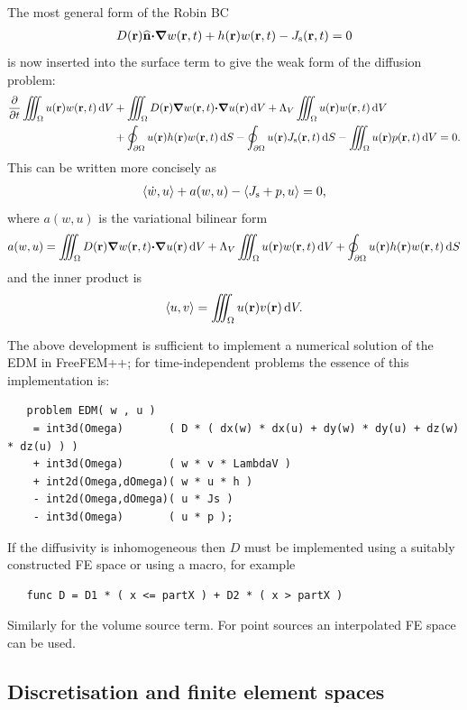\documentclass[a4paper]{article}
\numberwithin{equation}{section}
\providecommand\oiint{\oint}
\begin{document}
The most general form of the Robin BC
\begin{align}
D(\boldsymbol{\mathrm{r}})\widehat{\boldsymbol{\mathrm{n}}}{\boldsymbol{\mathrm{\cdot}}}{\boldsymbol{\mathrm{\nabla}}} w(\boldsymbol{\mathrm{r}},t) +h(\boldsymbol{\mathrm{r}}) w(\boldsymbol{\mathrm{r}},t)-J_{\mathrm{s}}(\boldsymbol{\mathrm{r}},t)=0
\end{align}
is now inserted into the surface term to give the weak form of the diffusion
problem:
\begin{align}
\frac{{\partial}}{{\partial}t}\iiint_{\Omega} u\pr w\prt\dif{V}
&+\iiint_{\Omega} D\pr{\vnabla}w\prt{\vcdot}{\vnabla}u\pr\dif{V}
+\Lambda_V \iiint_{\Omega} u\pr w\prt\dif{V} \nonumber \\
&+\oiint_{\partial\Omega} u\pr h\pr w\prt\dif{S}
-\oiint_{\partial\Omega} u\pr J_\rs\prt\dif{S}
-\iiint_{\Omega} u\pr p\prt\dif{V}=0.
\end{align}
This can be written more concisely as
\begin{align}
\langle \dot{w},u \rangle + a(w,u) - \langle J_{\mathrm{s}}+p ,u \rangle = 0,
\end{align}
where $a(w,u)$ is the variational bilinear form
\begin{align}
a(w,u)
=\iiint_{\Omega} D\pr{\vnabla}w\prt{\vcdot}{\vnabla}u\pr\dif{V}
+\Lambda_V \iiint_{\Omega} u\pr w\prt\dif{V}
+\oiint_{\partial\Omega} u\pr h\pr w\prt\dif{S}
\end{align}
and the inner product is
\begin{align}
\langle u , v \rangle
= \iiint_{\Omega} u(\boldsymbol{\mathrm{r}}) v(\boldsymbol{\mathrm{r}}) \,\mathrm{d}{V}.
\end{align}

The above development is sufficient to implement a numerical solution of the EDM in FreeFEM++; for 
time-independent problems the essence of this implementation is:
\begin{verbatim}
   problem EDM( w , u ) 
    = int3d(Omega)       ( D * ( dx(w) * dx(u) + dy(w) * dy(u) + dz(w) * dz(u) ) )
    + int3d(Omega)       ( w * v * LambdaV )
    + int2d(Omega,dOmega)( w * u * h )   
    - int2d(Omega,dOmega)( u * Js )
    - int3d(Omega)       ( u * p );
\end{verbatim}
If the diffusivity is inhomogeneous then $D$ must be implemented using a
suitably constructed FE space or using a macro, for example
\begin{verbatim}
   func D = D1 * ( x <= partX ) + D2 * ( x > partX )  
\end{verbatim}
Similarly for the volume source term. For point sources an interpolated 
FE space can be used.

\subsection[Discretisation and finite element spaces]{Discretisation and finite element spaces}
\label{sc:fem:discrete}
\end{document}
